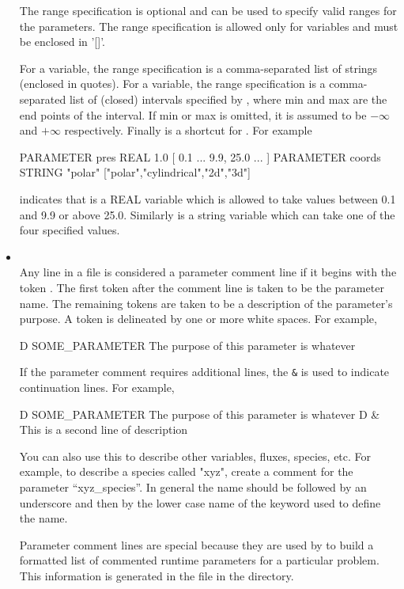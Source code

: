 \begin{itemize}
The range specification is optional and can be used to specify valid ranges
for the parameters. The range specification is allowed only for  variables and must be enclosed in '[]'.

For a  variable, the range specification is a comma-separated
list of strings (enclosed in quotes). For a  variable,
the range specification is a comma-separated list of (closed) intervals
specified by , where min and max are the end points of
the interval. If min or max is omitted, it is assumed to be $-\infty$
and $+\infty$ respectively. Finally  is a shortcut for
. For example
\begin{codeseg}
PARAMETER pres REAL 1.0 [ 0.1 ... 9.9, 25.0 ... ]
PARAMETER coords STRING "polar" ["polar","cylindrical","2d","3d"]
\end{codeseg}

indicates that  is a REAL variable which is allowed to take
values between 0.1 and 9.9 or above 25.0. Similarly 
is a string variable which can take one of the four specified values.

\item {}  \\
Any line in a  file is considered a parameter comment
line if it begins with the token . The first token after the
comment line is taken to be the parameter name. The remaining tokens
are taken to be a description of the parameter's purpose. A token is
delineated by one or more white spaces. For example,
\begin{codeseg}
D SOME_PARAMETER The purpose of this parameter is whatever
\end{codeseg} 
If the parameter comment requires additional lines, the \texttt{\&}
is used to indicate continuation lines. For example,
\begin{codeseg}
D SOME_PARAMETER The purpose of this parameter is whatever
D &              This is a second line of description
\end{codeseg}

You can also use this to describe other variables, fluxes, species, etc.
For example, to describe a species called "xyz", create a comment
for the parameter ``xyz\_species''. In general the name should be followed by
an underscore and then by the lower case name of the keyword used to define the
name.

Parameter comment lines are special because they are used by
\setup to build a formatted list of commented runtime parameters
for a particular problem. This information is generated
in the file  in the  directory.



\end{itemize}

